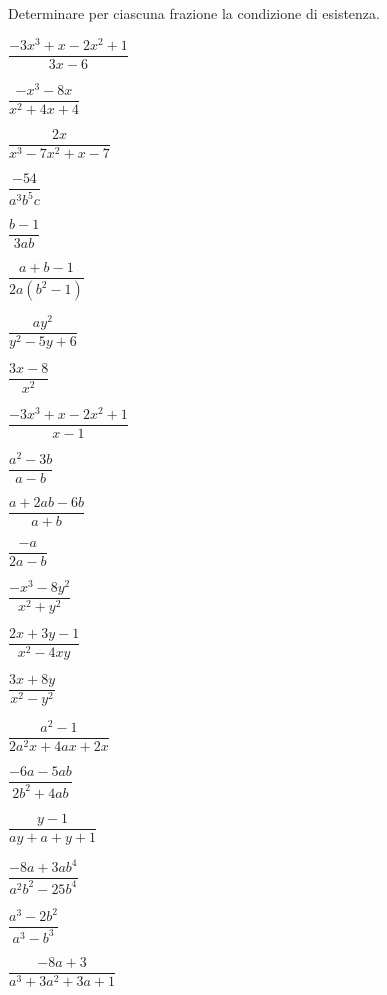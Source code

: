 \begin{esercizio}
\label{ese:19.1}
Determinare per ciascuna frazione la condizione di esistenza.
\begin{multicols}{3}
\begin{enumeratea}
 \item $\dfrac{-3x^{3}+x-2x^{2}+1}{3x-6}$
 \item $\dfrac{-x^{3}-8x}{x^{2}+4x+4}$
 \item $\dfrac{2x}{x^{3}-7x^{2}+x-7}$
 \item $\dfrac{-54}{a^{3}b^{5}c}$
 \item $\dfrac{b-1}{3ab}$
 \item $\dfrac{a+b-1}{2a \left(b^{2}-1\right)}$
 \item $\dfrac{ay^{2}}{y^{2}-5y+6}$
 \item $\dfrac{3x-8}{x^{2}}$
 \item $\dfrac{-3x^{3}+x-2x^{2}+1}{x-1}$
 \item $\dfrac{a^{{2}}-3b}{a-b}$
 \item $\dfrac{a+2ab-6b}{a+b}$
 \item $\dfrac{-a}{2a-b}$
 \item $\dfrac{-x^{{3}}-8y^{{2}}}{x^{{2}}+y^{{2}}}$
 \item $\dfrac{2x+3y-1}{x^{2}-4xy}$
 \item $\dfrac{3x+8y}{x^{2}-y^{2}}$
 \item $\dfrac{a^{2}-1}{2a^{2}x+4ax+2x}$
 \item $\dfrac{-6a-5ab}{2b^{2}+4ab}$
 \item $\dfrac{y-1}{ay+a+y+1}$
 \item $\dfrac{-8a+3ab^{4}}{a^{2}b^{2}-25b^{4}}$
 \item $\dfrac{a^{3}-2b^{2}}{a^{3}-b^{3}}$
 \item $\dfrac{-8a+3}{a^{3}+3a^{2}+3a+1}$
\end{enumeratea}
\end{multicols}
\end{esercizio}

\subsubsection*{}

